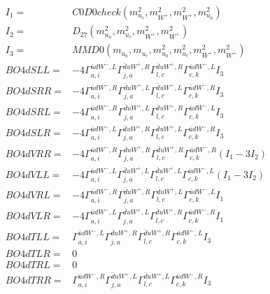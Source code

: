 \documentclass[A4,landscape]{article}
\begin{document}
\begin{align} 
I_1 = & C0D0check(m^2_{u_{{c}}}, m^2_{W^+}, m^2_{W^+}, m^2_{u_{{a}}}) \\ 
I_2 = & D_{27}(m^2_{u_{{a}}}, m^2_{u_{{c}}}, m^2_{W^+}, m^2_{W^+}) \\ 
I_3 = & MMD0(m_{u_{{a}}}, m_{u_{{c}}}, m^2_{u_{{a}}}, m^2_{u_{{c}}}, m^2_{W^+}, m^2_{W^+}) \\ 
  BO4dSLL= & -4  \Gamma^{\bar{u}d W^-,L}_{a, i} \Gamma^{\bar{d}u W^+ ,R}_{j, a} \Gamma^{\bar{d}u W^+ ,R}_{l, c} \Gamma^{\bar{u}d W^-,L}_{c, k} I_3 \\ 
  BO4dSRR= & -4  \Gamma^{\bar{u}d W^-,R}_{a, i} \Gamma^{\bar{d}u W^+ ,L}_{j, a} \Gamma^{\bar{d}u W^+ ,L}_{l, c} \Gamma^{\bar{u}d W^-,R}_{c, k} I_3 \\ 
  BO4dSRL= & -4  \Gamma^{\bar{u}d W^-,R}_{a, i} \Gamma^{\bar{d}u W^+ ,L}_{j, a} \Gamma^{\bar{d}u W^+ ,R}_{l, c} \Gamma^{\bar{u}d W^-,L}_{c, k} I_3 \\ 
  BO4dSLR= & -4  \Gamma^{\bar{u}d W^-,L}_{a, i} \Gamma^{\bar{d}u W^+ ,R}_{j, a} \Gamma^{\bar{d}u W^+ ,L}_{l, c} \Gamma^{\bar{u}d W^-,R}_{c, k} I_3 \\ 
  BO4dVRR= & -4  \Gamma^{\bar{u}d W^-,R}_{a, i} \Gamma^{\bar{d}u W^+ ,R}_{j, a} \Gamma^{\bar{d}u W^+ ,R}_{l, c} \Gamma^{\bar{u}d W^-,R}_{c, k} (I_1 - 3 I_2) \\ 
  BO4dVLL= & -4  \Gamma^{\bar{u}d W^-,L}_{a, i} \Gamma^{\bar{d}u W^+ ,L}_{j, a} \Gamma^{\bar{d}u W^+ ,L}_{l, c} \Gamma^{\bar{u}d W^-,L}_{c, k} (I_1 - 3 I_2) \\ 
  BO4dVRL= & -4  \Gamma^{\bar{u}d W^-,R}_{a, i} \Gamma^{\bar{d}u W^+ ,R}_{j, a} \Gamma^{\bar{d}u W^+ ,L}_{l, c} \Gamma^{\bar{u}d W^-,L}_{c, k} I_1 \\ 
  BO4dVLR= & -4  \Gamma^{\bar{u}d W^-,L}_{a, i} \Gamma^{\bar{d}u W^+ ,L}_{j, a} \Gamma^{\bar{d}u W^+ ,R}_{l, c} \Gamma^{\bar{u}d W^-,R}_{c, k} I_1 \\ 
  BO4dTLL= &  \Gamma^{\bar{u}d W^-,L}_{a, i} \Gamma^{\bar{d}u W^+ ,R}_{j, a} \Gamma^{\bar{d}u W^+ ,R}_{l, c} \Gamma^{\bar{u}d W^-,L}_{c, k} I_3 \\ 
  BO4dTLR= & 0 \\ 
  BO4dTRL= & 0 \\ 
  BO4dTRR= &  \Gamma^{\bar{u}d W^-,R}_{a, i} \Gamma^{\bar{d}u W^+ ,L}_{j, a} \Gamma^{\bar{d}u W^+ ,L}_{l, c} \Gamma^{\bar{u}d W^-,R}_{c, k} I_3 \\ 
\end{align} 
\end{document}
